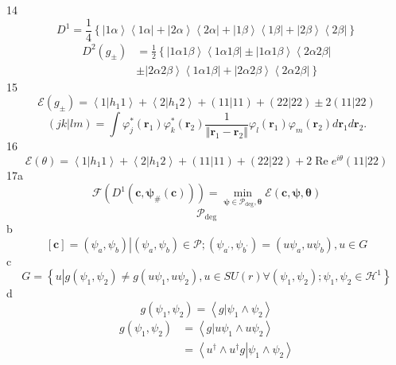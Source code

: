 \documentclass[aps,preprint]{revtex4}%
\begin{document}
14%
\[
D^{1}=\frac{1}{4}\left\{  \left\vert 1\alpha\right\rangle \left\langle
1\alpha\right\vert +\left\vert 2\alpha\right\rangle \left\langle
2\alpha\right\vert +\left\vert 1\beta\right\rangle \left\langle 1\beta
\right\vert +\left\vert 2\beta\right\rangle \left\langle 2\beta\right\vert
\right\}
\]%
\begin{align*}
D^{2}\left(  g_{\pm}\right)   &  =\frac{1}{2}\left\{  \left\vert 1\alpha
1\beta\right\rangle \left\langle 1\alpha1\beta\right\vert \pm\left\vert
1\alpha1\beta\right\rangle \left\langle 2\alpha2\beta\right\vert \right. \\
&  \left.  \pm\left\vert 2\alpha2\beta\right\rangle \left\langle 1\alpha
1\beta\right\vert +\left\vert 2\alpha2\beta\right\rangle \left\langle
2\alpha2\beta\right\vert \right\}
\end{align*}
15%
\[
\mathcal{E}\left(  g_{\pm}\right)  =\left\langle 1\left\vert h_{1}1\right.
\right\rangle +\left\langle 2\left\vert h_{1}2\right.  \right\rangle +\left(
\left.  11\right\vert 11\right)  +\left(  \left.  22\right\vert 22\right)
\pm2\left(  \left.  11\right\vert 22\right)
\]%
\[
\left(  \left.  jk\right\vert lm\right)  =\int\varphi_{j}^{\ast}\left(
\mathbf{r}_{1}\right)  \varphi_{k}^{\ast}\left(  \mathbf{r}_{2}\right)
\frac{1}{\left\Vert \mathbf{r}_{1}-\mathbf{r}_{2}\right\Vert }\varphi
_{l}\left(  \mathbf{r}_{1}\right)  \varphi_{m}\left(  \mathbf{r}_{2}\right)
d\mathbf{r}_{1}d\mathbf{r}_{2}.
\]
16%
\[
\mathcal{E}\left(  \theta\right)  =\left\langle 1\left\vert h_{1}1\right.
\right\rangle +\left\langle 2\left\vert h_{1}2\right.  \right\rangle +\left(
\left.  11\right\vert 11\right)  +\left(  \left.  22\right\vert 22\right)
+2\operatorname{Re}e^{i\theta}\left(  \left.  11\right\vert 22\right)
\]
17a%
\[
\mathcal{F}\left(  D^{1}\left(  \mathbf{c,\psi}_{\#}\left(  \mathbf{c}\right)
\right)  \right)  =\min_{\mathbf{\psi\in}\mathcal{P}_{\deg},\mathbf{\theta}%
}\mathcal{E}\left(  \mathbf{c,\psi,\theta}\right)
\]%
\[
\mathcal{P}_{\deg}%
\]
b%
\[
\left[  \mathbf{c}\right]  =\left.  \left(  \psi_{a},\psi_{b}\right)
\right\vert \left(  \psi_{a},\psi_{b}\right)  \in\mathcal{P};\left(
\psi_{a^{\prime}},\psi_{b^{\prime}}\right)  =\left(  u\psi_{a},u\psi
_{b}\right)  ,u\in G
\]
c%
\[
G=\left\{  u\left\vert g\left(  \psi_{1},\psi_{2}\right)  \neq g\left(
u\psi_{1},u\psi_{2}\right)  ,u\in SU\left(  r\right)  \right.  \forall\left(
\psi_{1},\psi_{2}\right)  ;\psi_{1},\psi_{2}\in\mathcal{H}^{1}\right\}
\]
d%
\[
g\left(  \psi_{1},\psi_{2}\right)  =\left\langle \left.  g\right\vert \psi
_{1}\wedge\psi_{2}\right\rangle
\]%
\begin{align*}
g\left(  \psi_{1},\psi_{2}\right)   &  =\left\langle \left.  g\right\vert
u\psi_{1}\wedge u\psi_{2}\right\rangle \\
&  =\left\langle \left.  u^{\dagger}\wedge u^{\dagger}g\right\vert \psi
_{1}\wedge\psi_{2}\right\rangle
\end{align*}%
\end{document}
